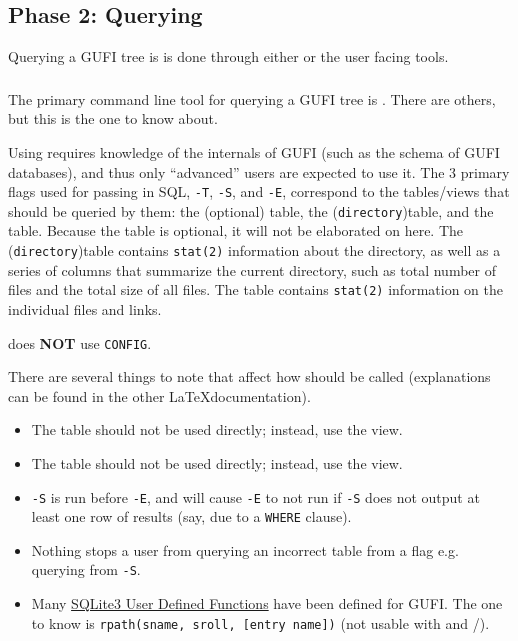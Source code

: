 \subsection{Phase 2: Querying}
Querying a GUFI tree is is done through either \gufiquery or the user
facing tools.

\subsubsection{\gufiquery}
The primary command line tool for querying a GUFI tree is
\gufiquery. There are others, but this is the one to know about.

Using \gufiquery requires knowledge of the internals of GUFI (such as
the schema of GUFI databases), and thus only ``advanced'' users are
expected to use it. The 3 primary flags used for passing in SQL,
\texttt{-T}, \texttt{-S}, and \texttt{-E}, correspond to the
tables/views that should be queried by them: the (optional)
\treesummary table, the (\texttt{directory})\summary table, and the
\entries table. Because the \treesummary table is optional, it will
not be elaborated on here. The (\texttt{directory})\summary table
contains \texttt{stat(2)} information about the directory, as well as
a series of columns that summarize the current directory, such as
total number of files and the total size of all files. The \entries
table contains \texttt{stat(2)} information on the individual files
and links.

\gufiquery does \textbf{NOT} use \texttt{CONFIG}.

There are several things to note that affect how \gufiquery should be
called (explanations can be found in the other \LaTeX documentation).

\begin{itemize}
\item The \entries table should not be used directly; instead, use the
  \vrpentries view.
\item The \summary table should not be used directly; instead, use the
  \vrsummary view.
\item \texttt{-S} is run before \texttt{-E}, and will cause
  \texttt{-E} to not run if \texttt{-S} does not output at least one
  row of results (say, due to a \texttt{WHERE} clause).
\item Nothing stops a user from querying an incorrect table from a
  flag e.g. querying \vrpentries from \texttt{-S}.
\item Many \href{https://sqlite.org/appfunc.html}{SQLite3 User Defined
  Functions} have been defined for GUFI. The one to know is
  \texttt{rpath(sname, sroll, [entry name])} (not usable with \summary
  and \entries/\pentries).
\end{itemize}

